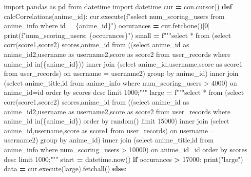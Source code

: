 \documentclass[
]{article}
\newenvironment{Shaded}{\begin{snugshade}}{\end{snugshade}}
\newcommand{\BuiltInTok}[1]{#1}
\newcommand{\ControlFlowTok}[1]{\textcolor[rgb]{0.13,0.29,0.53}{\textbf{#1}}}
\newcommand{\DecValTok}[1]{\textcolor[rgb]{0.00,0.00,0.81}{#1}}
\newcommand{\ImportTok}[1]{#1}
\newcommand{\KeywordTok}[1]{\textcolor[rgb]{0.13,0.29,0.53}{\textbf{#1}}}
\newcommand{\NormalTok}[1]{#1}
\newcommand{\OperatorTok}[1]{\textcolor[rgb]{0.81,0.36,0.00}{\textbf{#1}}}
\newcommand{\SpecialCharTok}[1]{\textcolor[rgb]{0.00,0.00,0.00}{#1}}
\newcommand{\SpecialStringTok}[1]{\textcolor[rgb]{0.31,0.60,0.02}{#1}}
\newcommand{\StringTok}[1]{\textcolor[rgb]{0.31,0.60,0.02}{#1}}
\begin{document}
\begin{Shaded}
\begin{Highlighting}[]
\ImportTok{import}\NormalTok{ pandas }\ImportTok{as}\NormalTok{ pd}
\ImportTok{from}\NormalTok{ datetime }\ImportTok{import}\NormalTok{ datetime}
\NormalTok{cur }\OperatorTok{=}\NormalTok{ con.cursor()}
\KeywordTok{def}\NormalTok{ calcCorrelations(anime\_id):}
\NormalTok{    cur.execute(}\SpecialStringTok{f"select num\_scoring\_users from anime\_info where id = }\SpecialCharTok{\{}\NormalTok{anime\_id}\SpecialCharTok{\}}\SpecialStringTok{"}\NormalTok{)}
\NormalTok{    occurances }\OperatorTok{=}\NormalTok{ cur.fetchone()[}\DecValTok{0}\NormalTok{]}
    \BuiltInTok{print}\NormalTok{(}\SpecialStringTok{f"num\_scoring\_users: }\SpecialCharTok{\{}\NormalTok{occurances}\SpecialCharTok{\}}\SpecialStringTok{"}\NormalTok{)}
\NormalTok{    small }\OperatorTok{=} \SpecialStringTok{f"""select * from}
\SpecialStringTok{    (select corr(score1,score2) scores,anime\_id from }
\SpecialStringTok{    ((select anime\_id as anime\_id2,username as username2,score as score2  from user\_records where anime\_id in(}\SpecialCharTok{\{}\NormalTok{anime\_id}\SpecialCharTok{\}}\SpecialStringTok{)) }
\SpecialStringTok{    inner join  (select anime\_id,username,score as score1 from user\_records)}
\SpecialStringTok{    on  username = username2) group by anime\_id) inner join (select anime\_title,id from anime\_info where num\_scoring\_users \textgreater{} 4000)  on anime\_id=id order by scores desc limit 1000;"""}
\NormalTok{    large }\OperatorTok{=}    \SpecialStringTok{f"""select * from}
\SpecialStringTok{    (select corr(score1,score2) scores,anime\_id from }
\SpecialStringTok{    ((select anime\_id as anime\_id2,username as username2,score as score2  from user\_records where anime\_id in(}\SpecialCharTok{\{}\NormalTok{anime\_id}\SpecialCharTok{\}}\SpecialStringTok{) order by random() limit 15000) }
\SpecialStringTok{    inner join  (select anime\_id,username,score as score1 from user\_records)}
\SpecialStringTok{    on  username = username2) group by anime\_id) inner join (select anime\_title,id from anime\_info where num\_scoring\_users \textgreater{} 10000)  on anime\_id=id order by scores desc limit 1000;"""} 
\NormalTok{    start }\OperatorTok{=}\NormalTok{ datetime.now()}
    \ControlFlowTok{if}\NormalTok{ occurances }\OperatorTok{\textgreater{}} \DecValTok{17000}\NormalTok{:}
        \BuiltInTok{print}\NormalTok{(}\StringTok{"large"}\NormalTok{)}
\NormalTok{        data }\OperatorTok{=}\NormalTok{ cur.execute(large).fetchall()}
    \ControlFlowTok{else}\NormalTok{:}

\end{Highlighting}
\end{Shaded}
\end{document}

